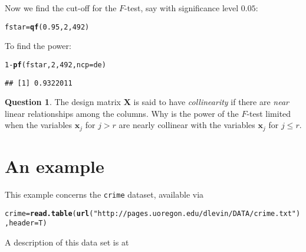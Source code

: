 \documentclass{amsart}\usepackage[]{graphicx}\usepackage[]{color}
\makeatletter
\newcommand{\hlnum}[1]{\textcolor[rgb]{0.686,0.059,0.569}{#1}}%
\newcommand{\hlstr}[1]{\textcolor[rgb]{0.192,0.494,0.8}{#1}}%
\newcommand{\hlopt}[1]{\textcolor[rgb]{0,0,0}{#1}}%
\newcommand{\hlstd}[1]{\textcolor[rgb]{0.345,0.345,0.345}{#1}}%
\newcommand{\hlkwb}[1]{\textcolor[rgb]{0.69,0.353,0.396}{#1}}%
\newcommand{\hlkwc}[1]{\textcolor[rgb]{0.333,0.667,0.333}{#1}}%
\newcommand{\hlkwd}[1]{\textcolor[rgb]{0.737,0.353,0.396}{\textbf{#1}}}%
\newenvironment{kframe}{%
 \def\at@end@of@kframe{}%
 \ifinner\ifhmode%
  \def\at@end@of@kframe{\end{minipage}}%
  \begin{minipage}{\columnwidth}%
 \fi\fi%
 \def\FrameCommand##1{\hskip\@totalleftmargin \hskip-\fboxsep
 \colorbox{shadecolor}{##1}\hskip-\fboxsep
     \hskip-\linewidth \hskip-\@totalleftmargin \hskip\columnwidth}%
 \MakeFramed {\advance\hsize-\width
   \@totalleftmargin\z@ \linewidth\hsize
   \@setminipage}}%
 {\par\unskip\endMakeFramed%
 \at@end@of@kframe}
\newenvironment{knitrout}{}{} %
\newcommand{\bvec}[1]{{\boldsymbol #1}}
\newcommand{\x}{\bvec{x}}
\theoremstyle{definition}
\newtheorem{question}{Question}
\makeatother
\begin{document}
Now we find the cut-off for the $F$-test, say with significance level $0.05$:

\begin{knitrout}
\color{fgcolor}\begin{kframe}
\begin{alltt}
\hlstd{fstar} \hlkwb{=} \hlkwd{qf}\hlstd{(}\hlnum{0.95}\hlstd{,}\hlnum{2}\hlstd{,}\hlnum{492}\hlstd{)}
\end{alltt}
\end{kframe}
\end{knitrout}

To find the power:
\begin{knitrout}
\color{fgcolor}\begin{kframe}
\begin{alltt}
\hlnum{1} \hlopt{-} \hlkwd{pf}\hlstd{(fstar,}\hlnum{2}\hlstd{,}\hlnum{492}\hlstd{,}\hlkwc{ncp} \hlstd{= de)}
\end{alltt}
\begin{verbatim}
## [1] 0.9322011
\end{verbatim}
\end{kframe}
\end{knitrout}
\begin{question}
The design matrix $\bvec{X}$ is said to have
\emph{collinearity} if there are \emph{near} linear relationships among the columns.  Why is the power of the $F$-test
limited when the variables $\x_j$ for $j > r$ are nearly
collinear with the variables $\x_j$ for $j \leq r$.
\end{question}

\section{An example}

This example concerns the \verb|crime| dataset, available
via
\begin{knitrout}
\color{fgcolor}\begin{kframe}
\begin{alltt}
\hlstd{crime} \hlkwb{=} \hlkwd{read.table}\hlstd{(}\hlkwd{url}\hlstd{(}\hlstr{"http://pages.uoregon.edu/dlevin/DATA/crime.txt"}\hlstd{),}\hlkwc{header}\hlstd{=T)}
\end{alltt}
\end{kframe}
\end{knitrout}
A description of this data set is at
\end{document}
